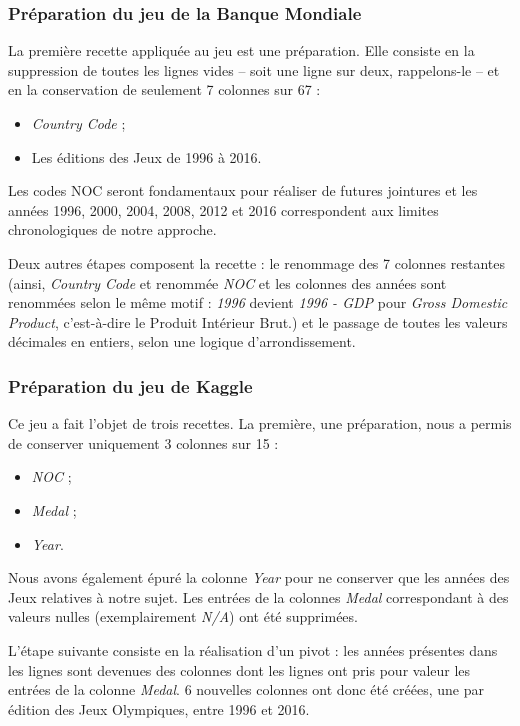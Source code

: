\documentclass[hidelinks, 12pt]{article}
\begin{document}
\subsubsection{Préparation du jeu de la Banque Mondiale}

La première recette appliquée au jeu est une préparation. Elle consiste en la suppression de toutes les lignes vides -- soit une ligne sur deux, rappelons-le -- et en la conservation de seulement 7 colonnes sur 67 :
\begin{itemize}
	\item \emph{Country Code} ;
	\item Les éditions des Jeux de 1996 à 2016.
\end{itemize}
Les codes NOC seront fondamentaux pour réaliser de futures jointures et les années 1996, 2000, 2004, 2008, 2012 et 2016 correspondent aux limites chronologiques de notre approche.

Deux autres étapes composent la recette : le renommage des 7 colonnes restantes (ainsi, \emph{Country Code } et renommée \emph{NOC} et les colonnes des années sont renommées selon le même motif : \emph{1996} devient \emph{1996 - GDP} pour \emph{Gross Domestic Product}, c'est-à-dire le Produit Intérieur Brut.) et le passage de toutes les valeurs décimales en entiers, selon une logique d'arrondissement. 

\subsubsection{Préparation du jeu de Kaggle}

Ce jeu a fait l'objet de trois recettes. La première, une préparation, nous a permis de conserver uniquement 3 colonnes sur 15 :
\begin{itemize}
	\item \emph{NOC} ;
	\item \emph{Medal} ;
	\item \emph{Year}.
\end{itemize}
Nous avons également épuré la colonne \emph{Year} pour ne conserver que les années des Jeux relatives à notre sujet. Les entrées de la colonnes \emph{Medal} correspondant à des valeurs nulles (exemplairement \emph{N/A}) ont été supprimées. 

L'étape suivante consiste en la réalisation d'un pivot : les années présentes dans les lignes sont devenues des colonnes dont les lignes ont pris pour valeur les entrées de la colonne \emph{Medal}. 6 nouvelles colonnes ont donc été créées, une par édition des Jeux Olympiques, entre 1996 et 2016.
\end{document}
